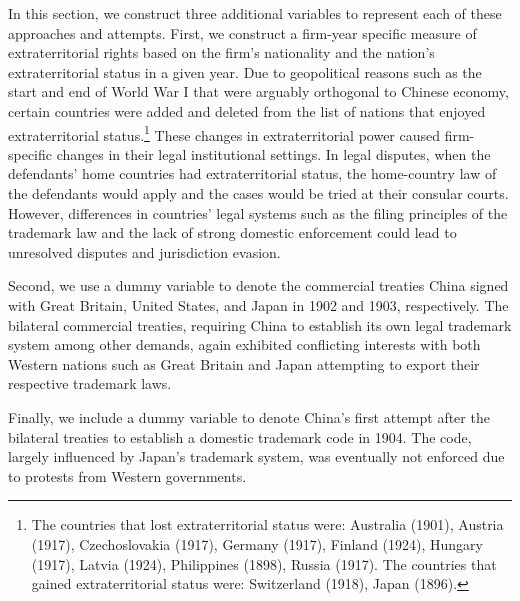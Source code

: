 \documentclass[12pt]{article}
\begin{document}
In this section, we construct three additional variables to represent each of these approaches and attempts. First, we construct a firm-year specific measure of extraterritorial rights based on the firm's nationality and the nation's extraterritorial status in a given year. Due to geopolitical reasons such as the start and end of World War I that were arguably orthogonal to Chinese economy, certain countries were added and deleted from the list of nations that enjoyed extraterritorial status.\footnote{The countries that lost extraterritorial status were: Australia (1901), Austria (1917), Czechoslovakia (1917), Germany (1917), Finland (1924), Hungary (1917), Latvia (1924), Philippines (1898), Russia (1917). The countries that gained extraterritorial status were: Switzerland (1918), Japan (1896).} These changes in extraterritorial power caused firm-specific changes in their legal institutional settings. In legal disputes, when the defendants' home countries had extraterritorial status, the home-country law of the defendants would apply and the cases would be tried at their consular courts. However, differences in countries' legal systems such as the filing principles of the trademark law and the lack of strong domestic enforcement could lead to unresolved disputes and jurisdiction evasion.

Second, we use a dummy variable to denote the commercial treaties China signed with Great Britain, United States, and Japan in 1902 and 1903, respectively. The bilateral commercial treaties, requiring China to establish its own legal trademark system among other demands, again exhibited conflicting interests with both Western nations such as Great Britain and Japan attempting to export their respective trademark laws. 

Finally, we include a dummy variable to denote China's first attempt after the bilateral treaties to establish a domestic trademark code in 1904. The code, largely influenced by Japan's trademark system, was eventually not enforced due to protests from Western governments.
\end{document}
